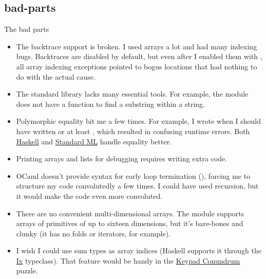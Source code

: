 \documentclass{article}
\begin{document}
\subsection{bad-parts}{The bad parts}
\begin{itemize}
\item The backtrace support is broken.
  I used arrays a lot and had many indexing bugs.
  Backtraces are disabled by default, but even after I enabled them with , all array indexing exceptions pointed to bogus locations that had nothing to do with the actual cause.
\item
  The standard library lacks many essential tools.
  For example, the \href{https://ocaml.org/manual/5.2/api/String.html}{} module does not have a function to find a substring within a string.
\item
  Polymorphic equality bit me a few times.
  For example, I wrote  when I should have written  or at least , which resulted in confusing runtime errors.
  Both \href{https://www.haskell.org/?uwu=true}{Haskell} and \href{https://en.wikipedia.org/wiki/Standard_ML}{Standard ML} handle equality better.
\item
  Printing arrays and lists for debugging requires writing extra code.
\item
  OCaml doesn’t provide syntax for early loop termination (), forcing me to structure my code convolutedly a few times.
  I could have used recursion, but it would make the code even more convoluted.
\item
  There are no convenient multi-dimensional arrays.
  The  module supports arrays of primitives of up to sixteen dimensions, but it’s bare-bones and clunky (it has no folds or iterators, for example).
\item
  I wish I could use sum types as array indices (Haskell supports it through the \href{https://hackage.haskell.org/package/base-4.21.0.0/docs/Data-Ix.html}{Ix} typeclass).
  That feature would be handy in the \href{#keypad-conundrum}{Keypad Conundrum} puzzle.
\end{itemize}
\end{document}
